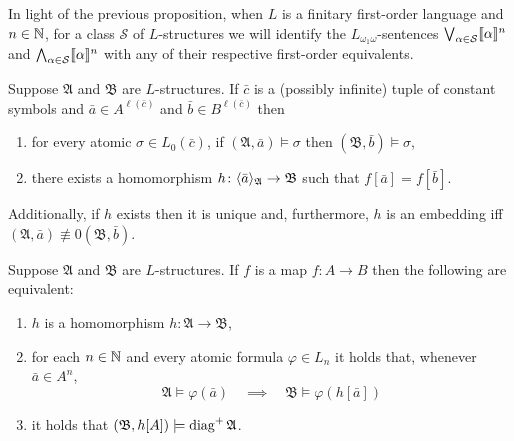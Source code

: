 In light of the previous proposition, when $L$ is a finitary first-order language and $n\in\mathbb{N}$, for a class $\mathcal{S}$ of $L$-structures we will identify the $L_{\omega_1\omega}$-sentences $\bigvee_{\alpha\in\mathcal{S}}\llbracket\alpha\rrbracket^{n}$ and $\bigwedge_{\alpha\in\mathcal{S}}\llbracket\alpha\rrbracket^{n}$ with any of their respective first-order equivalents.

\begin{lem}\label{lem:diagH}
	Suppose $\mathfrak{A}$ and $\mathfrak{B}$ are $L$-structures.  If $\bar{c}$ is a (possibly infinite) tuple of constant symbols and $\bar{a}\in A^{\ell(\bar{c})}$ and $\bar{b}\in B^{\ell(\bar{c})}$ then
	\begin{enumerate}
		\item 	for every atomic $\sigma\in L_0(\bar{c})$, if $(\mathfrak{A},\bar{a})\models\sigma$ then $(\mathfrak{B},\bar{b})\models\sigma$,
		\item  there exists a homomorphism $h\colon\langle \bar{a}\rangle_{\mathfrak{A}}\to\mathfrak{B}$ such that $f[\bar{a}]=f[\bar{b}]$.
	\end{enumerate}
	Additionally, if $h$ exists then it is unique and, furthermore, $h$ is an embedding iff $(\mathfrak{A},\bar{a})\nequiv{0}(\mathfrak{B},\bar{b})$.
\end{lem}

\begin{lem}\label{lem:diagp}
	Suppose $\mathfrak{A}$ and $\mathfrak{B}$ are $L$-structures.  If $f$ is a map $f\colon A\to B$ then the following are equivalent:
	\begin{enumerate}
		\item	$h$ is a homomorphism $h\colon\mathfrak{A}\to\mathfrak{B}$,
		\item	for each $n\in\mathbb{N}$ and every atomic formula $\varphi\in L_n$ it holds that, whenever $\bar{a}\in A^n$,
			\begin{equation}
				\mathfrak{A}\models\varphi(\bar{a}) \quad\implies\quad \mathfrak{B}\models\varphi(h[\bar{a}])
			\end{equation}
		\item	it holds that $(\mathfrak{B},h[A])\models\operatorname{{diag}^{+}}\mathfrak{A}$.
	\end{enumerate}
\end{lem}

